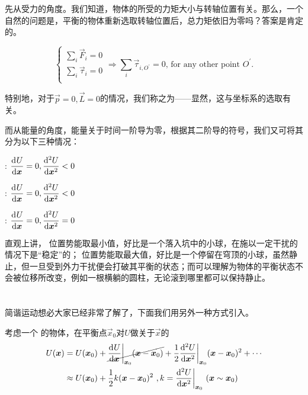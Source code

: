 先从受力的角度。我们知道，物体的所受的力矩大小与转轴位置有关。那么，一个自然的问题是，平衡的物体重新选取转轴位置后，总力矩依旧为零吗？答案是肯定的。
\begin{law}
    $$\left\{\begin{aligned}
            \sum\limits_{i}\vec{F}_{i}=0    \\
            \sum\limits_{i}\vec{\tau}_{i}=0 \\
        \end{aligned}
        \right.
        \Longrightarrow \sum\limits_{i}\vec{\tau}_{i,O^{\prime}}=0\text{, for any other point }O^{\prime}.
    $$
\end{law}\par
特别地，对于$\vec{p}=0,\vec{L}=0$的情况，我们称之为——显然，这与坐标系的选取有关。

而从能量的角度，能量关于时间一阶导为零，根据其二阶导的符号，我们又可将其分为以下三种情况：
\begin{Itemize}
    \item {}: $\D[]{U}{\vec{x}}=0,\D[2]{U}{\vec{x}}<0$
    \item {}: $\D[]{U}{\vec{x}}=0,\D[2]{U}{\vec{x}}<0$
    \item {}: $\D[]{U}{\vec{x}}=0,\D[2]{U}{\vec{x}}=0$
\end{Itemize}

直观上讲， 位置势能取最小值，好比是一个落入坑中的小球，在施以一定干扰的情况下是“稳定”的； 位置势能取最大值，好比是一个停留在穹顶的小球，虽然静止，但一旦受到外力干扰便会打破其平衡的状态；而可以理解为物体的平衡状态不会被位移所改变，例如一根横躺的圆柱，无论滚到哪里都可以保持静止。
\section[振动]{}
\subsection[简谐运动]{}
简谐运动想必大家已经非常了解了，下面我们用另外一种方式引入。

考虑一个  的物体，在平衡点$\vec{x}_0$对$U$做关于$\vec{x}$的 
\[
    \begin{aligned}
        U(\vec{x}) & =U(\vec{x}_0)+\cancel{\D[]{U}{\vec{x}}\bigg|_{\vec{x}_0}(\vec{x}-\vec{x}_0)}+\frac{1}{2} \D[2]{U}{\vec{x}}\bigg|_{\vec{x}_0}(\vec{x}-\vec{x}_0)^2+\cdots \\
                   & \approx U(\vec{x}_0)+\frac{1}{2} k (\vec{x}-\vec{x}_0)^2\ ,k=\D[2]{U}{\vec{x}}\bigg|_{\vec{x}_0}\  (\vec{x} \sim \vec{x}_0)
    \end{aligned}
\]

